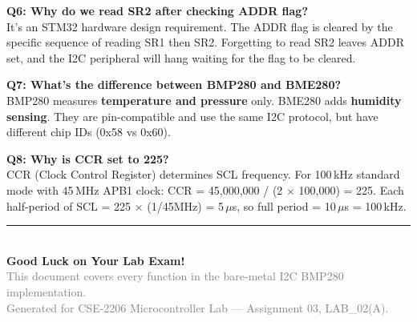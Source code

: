 \documentclass[12pt, a4paper]{article}
\begin{document}
\begin{tcolorbox}
\vspace{0.4cm}
\textbf{\textcolor{accentblue}{Q6: Why do we read SR2 after checking ADDR flag?}}\\
It's an STM32 hardware design requirement. The ADDR flag is cleared by the specific sequence of reading SR1 then SR2. Forgetting to read SR2 leaves ADDR set, and the I2C peripheral will hang waiting for the flag to be cleared.

\vspace{0.4cm}
\textbf{\textcolor{accentblue}{Q7: What's the difference between BMP280 and BME280?}}\\
BMP280 measures \textbf{temperature and pressure} only. BME280 adds \textbf{humidity sensing}. They are pin-compatible and use the same I2C protocol, but have different chip IDs (0x58 vs 0x60).

\vspace{0.4cm}
\textbf{\textcolor{accentblue}{Q8: Why is CCR set to 225?}}\\
CCR (Clock Control Register) determines SCL frequency. For 100\,kHz standard mode with 45\,MHz APB1 clock: CCR = 45,000,000 / (2 $\times$ 100,000) = 225. Each half-period of SCL = 225 $\times$ (1/45MHz) = 5\,$\mu$s, so full period = 10\,$\mu$s = 100\,kHz.
\end{tcolorbox}

\vspace{1cm}
\begin{center}
\textcolor{accentblue}{\rule{0.8\linewidth}{1.5pt}}\\[0.5cm]
{\Large\bfseries\textcolor{deepblue}{Good Luck on Your Lab Exam! }}\\[0.3cm]
{\small\textcolor{gray}{This document covers every function in the bare-metal I2C BMP280 implementation.}}\\
{\small\textcolor{gray}{Generated for CSE-2206 Microcontroller Lab --- Assignment 03, LAB\_02(A).}}
\end{center}
\end{document}
